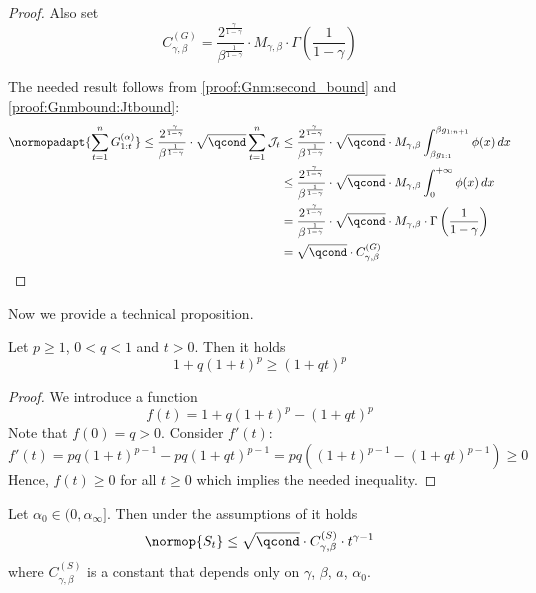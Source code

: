 \begin{proof}
    Also set
    \begin{equation}
        \label{def:CGgammabeta}
        C_{\gamma, \beta}^{(G)} = \frac{2^{\frac{\gamma}{1-\gamma}}}{\beta^{\frac{1}{1-\gamma}}}  \cdot M_{\gamma, \beta} \cdot \Gamma\left(\frac{1}{1-\gamma}\right)
    \end{equation}
    
    The needed result follows from \eqref{proof:Gnm:second_bound} and \eqref{proof:Gnmbound:Jtbound}:
    \begin{align}
        \label{bound:norm:sum_g1t:with_integral}
        \normopadapt{\sum_{t=1}^n G_{1:t}^{(\alpha)}} \leq \frac{2^{\frac{\gamma}{1-\gamma}}}{\beta^{\frac{1}{1-\gamma}}} \cdot \sqrt{\qcond}
        \sum_{t=1}^n {\mathcal{J}_t} &\leq \frac{2^{\frac{\gamma}{1-\gamma}}}{\beta^{\frac{1}{1-\gamma}}} \cdot \sqrt{\qcond} \cdot M_{\gamma, \beta} \int_{\beta g_{1:1}}^{\beta g_{1:n+1}} \phi(x) \, d x \\ &\leq \frac{2^{\frac{\gamma}{1-\gamma}}}{\beta^{\frac{1}{1-\gamma}}} \cdot \sqrt{\qcond} \cdot M_{\gamma, \beta} \int_{0}^{+\infty} \phi(x) \, d x \\ &= \frac{2^{\frac{\gamma}{1-\gamma}}}{\beta^{\frac{1}{1-\gamma}}} \cdot \sqrt{\qcond} \cdot M_{\gamma, \beta} \cdot \Gamma\left(\frac{1}{1-\gamma}\right) \\ &= \sqrt{\qcond}\cdot C_{\gamma, \beta}^{(G)}
    \end{align}
\end{proof}

Now we provide a technical proposition.

\begin{proposition}
    \label{prop:bound_for_st_prop}
    Let $p \geq  1$, $0 < q < 1$ and $t > 0$. Then it holds
    \begin{equation}
        1 + q (1+t)^p \geq (1+qt)^p
    \end{equation}
\end{proposition}

\begin{proof}
    We introduce a function
    \[f(t) = 1 + q(1+t)^p - (1+qt)^p\]
    Note that $f(0) = q > 0$. Consider $f'(t)$:
    \[f'(t) = pq(1+t)^{p-1} - pq(1+qt)^{p-1} = pq((1+t)^{p-1} - (1 + qt)^{p-1}) \geq 0\]
    Hence, $f(t) \geq 0$ for all $t \geq 0$ which implies the needed inequality.
\end{proof}

\begin{proposition}
    \label{prop:st_bound}
    Let $\alpha_0 \in (0, \alpha_{\infty}]$. Then under the assumptions of {} it holds
    \begin{equation}
        \label{bound:stmatrix}
        \normop{S_t} \leq \sqrt{\qcond} \cdot C_{\gamma, \beta}^{(S)} \cdot t^{\gamma-1}
    \end{equation}
    where $C_{\gamma, \beta}^{(S)}$ is a constant that depends only on $\gamma$, $\beta$, $a$, $\alpha_0$.
\end{proposition}

